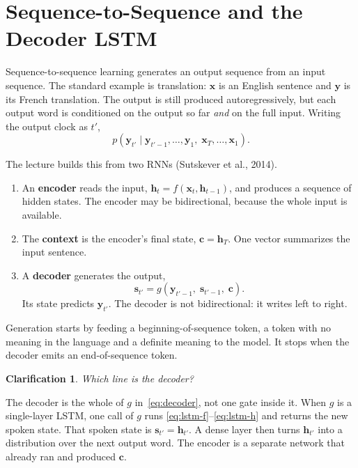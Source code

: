 \documentclass[11pt]{article}
\newtheorem*{clarification}{Clarification}
\begin{document}
\section{Sequence-to-Sequence and the Decoder LSTM}
\label{sec:seq2seq}

Sequence-to-sequence learning generates an output sequence from an input
sequence. The standard example is translation: \(\mathbf{x}\) is an English
sentence and \(\mathbf{y}\) is its French translation. The output is still
produced autoregressively, but each output word is conditioned on the
output so far \emph{and} on the full input. Writing the output clock as
\(t'\),
\[
p(\mathbf{y}_{t'}
\mid
\mathbf{y}_{t'-1},\ldots,\mathbf{y}_1,\;
\mathbf{x}_T,\ldots,\mathbf{x}_1).
\]

The lecture builds this from two RNNs (Sutskever et al., 2014).
\begin{enumerate}[leftmargin=*]
  \item An \textbf{encoder} reads the input,
        \(\mathbf{h}_t=f(\mathbf{x}_t,\mathbf{h}_{t-1})\), and produces a
        sequence of hidden states. The encoder may be bidirectional,
        because the whole input is available.
  \item The \textbf{context} is the encoder's final state,
        \(\mathbf{c}=\mathbf{h}_T\). One vector summarizes the input
        sentence.
  \item A \textbf{decoder} generates the output,
        \begin{equation}
        \label{eq:decoder}
        \mathbf{s}_{t'}
        =
        g(\mathbf{y}_{t'-1},\;\mathbf{s}_{t'-1},\;\mathbf{c}).
        \end{equation}
        Its state predicts \(\mathbf{y}_{t'}\). The decoder is not
        bidirectional: it writes left to right.
\end{enumerate}

Generation starts by feeding a beginning-of-sequence token, a token with no
meaning in the language and a definite meaning to the model. It stops when
the decoder emits an end-of-sequence token.

\begin{clarification}
Which line is the decoder?
\end{clarification}

The decoder is the whole of \(g\) in~\eqref{eq:decoder}, not one gate
inside it. When \(g\) is a single-layer LSTM, one call of \(g\) runs
\eqref{eq:lstm-f}--\eqref{eq:lstm-h} and returns the new spoken state.
That spoken state is \(\mathbf{s}_{t'}=\mathbf{h}_{t'}\). A dense layer
then turns \(\mathbf{h}_{t'}\) into a distribution over the next output
word. The encoder is a separate network that already ran and produced
\(\mathbf{c}\).
\end{document}
